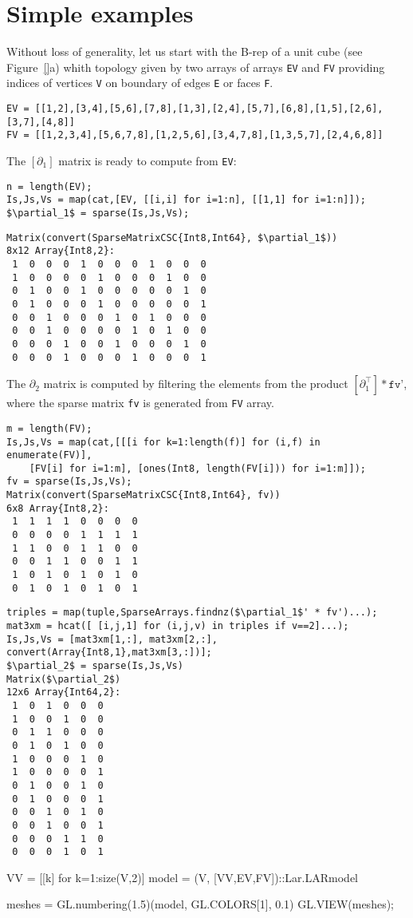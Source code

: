 \section{Simple examples}\label{examples}

Without loss of generality, let us start with the B-rep of a unit cube (see Figure~\ref{}a) whith topology given by two arrays of arrays \texttt{EV} and \texttt{FV} providing indices of vertices \texttt{V} on boundary of edges \texttt{E} or faces \texttt{F}.
{\small\begin{verbatim}
EV = [[1,2],[3,4],[5,6],[7,8],[1,3],[2,4],[5,7],[6,8],[1,5],[2,6],[3,7],[4,8]]
FV = [[1,2,3,4],[5,6,7,8],[1,2,5,6],[3,4,7,8],[1,3,5,7],[2,4,6,8]]
\end{verbatim}}
The $[\partial_1]$ matrix is ready to compute from \texttt{EV}:
{\small\begin{lstlisting}
n = length(EV);
Is,Js,Vs = map(cat,[EV, [[i,i] for i=1:n], [[1,1] for i=1:n]]);
$\partial_1$ = sparse(Is,Js,Vs);
\end{lstlisting}}
{\small\begin{lstlisting}
Matrix(convert(SparseMatrixCSC{Int8,Int64}, $\partial_1$))
8x12 Array{Int8,2}:
 1  0  0  0  1  0  0  0  1  0  0  0
 1  0  0  0  0  1  0  0  0  1  0  0
 0  1  0  0  1  0  0  0  0  0  1  0
 0  1  0  0  0  1  0  0  0  0  0  1
 0  0  1  0  0  0  1  0  1  0  0  0
 0  0  1  0  0  0  0  1  0  1  0  0
 0  0  0  1  0  0  1  0  0  0  1  0
 0  0  0  1  0  0  0  1  0  0  0  1
\end{lstlisting}}

The $\partial_2$ matrix is computed by filtering the elements from the product $[\partial_1^\top] * \texttt{fv'}$, where the sparse matrix \texttt{fv} is generated from \texttt{FV} array.

{\small\begin{lstlisting}
m = length(FV);
Is,Js,Vs = map(cat,[[[i for k=1:length(f)] for (i,f) in enumerate(FV)], 
    [FV[i] for i=1:m], [ones(Int8, length(FV[i])) for i=1:m]]);
fv = sparse(Is,Js,Vs);
Matrix(convert(SparseMatrixCSC{Int8,Int64}, fv))
6x8 Array{Int8,2}:
 1  1  1  1  0  0  0  0
 0  0  0  0  1  1  1  1
 1  1  0  0  1  1  0  0
 0  0  1  1  0  0  1  1
 1  0  1  0  1  0  1  0
 0  1  0  1  0  1  0  1
\end{lstlisting}}

{\small\begin{lstlisting}
triples = map(tuple,SparseArrays.findnz($\partial_1$' * fv')...);
mat3xm = hcat([ [i,j,1] for (i,j,v) in triples if v==2]...);
Is,Js,Vs = [mat3xm[1,:], mat3xm[2,:], convert(Array{Int8,1},mat3xm[3,:])];
$\partial_2$ = sparse(Is,Js,Vs)
Matrix($\partial_2$)
12x6 Array{Int64,2}:
 1  0  1  0  0  0
 1  0  0  1  0  0
 0  1  1  0  0  0
 0  1  0  1  0  0
 1  0  0  0  1  0
 1  0  0  0  0  1
 0  1  0  0  1  0
 0  1  0  0  0  1
 0  0  1  0  1  0
 0  0  1  0  0  1
 0  0  0  1  1  0
 0  0  0  1  0  1
\end{lstlisting}}


VV = [[k] for k=1:size(V,2)]
model = (V, [VV,EV,FV])::Lar.LARmodel

meshes = GL.numbering(1.5)(model, GL.COLORS[1], 0.1)
GL.VIEW(meshes);
